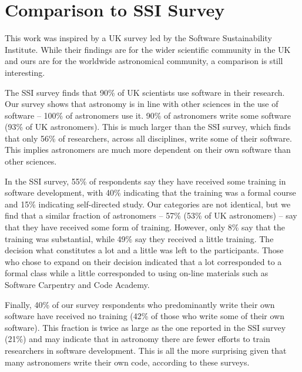 \section{Comparison to SSI Survey}
\label{sec:ssicompare}

This work was inspired by a UK survey led by the Software Sustainability Institute. While their findings are for the wider scientific community in the UK and ours are for the worldwide astronomical community, a comparison is still interesting. 

The SSI survey finds that 90\% of UK scientists use software in their research. Our survey shows that astronomy is in line with other sciences in the use of software --  100\% of astronomers use it. 90\% of astronomers write some software (93\% of UK astronomers). This is much larger than the SSI survey, which finds that only 56\% of researchers, across all disciplines, write some of their software.  This implies astronomers are much more dependent on their own software than other sciences.

In the SSI survey, 55\% of respondents say they have received some training in software development, with 40\% indicating that the training was a formal course and 15\% indicating self-directed study. Our categories are not identical, but we find that a similar fraction of astronomers -- 57\% (53\% of UK astronomers) -- say that they have received some form of training. However, only 8\% say that the training was substantial, while 49\% say they received a little training. The decision what constitutes a lot and a little was left to the participants. Those who chose to expand on their decision indicated that a lot corresponded to a formal class while a little corresponded to using on-line materials such as Software Carpentry and Code Academy.

Finally, 40\% of our survey respondents who predominantly write their own software have received no training (42\% of those who write some of their own software). This fraction is twice as large as the one reported in the SSI survey (21\%) and may indicate that in astronomy there are fewer efforts to train researchers in software development.  This is all the more surprising given that many  astronomers write their own code, according to these surveys.



    
  
  
  